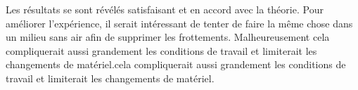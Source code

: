 Les résultats se sont révélés satisfaisant et en accord avec la théorie.
Pour améliorer l'expérience, il serait intéressant de tenter de faire la même chose dans un milieu sans air afin de supprimer les frottements. Malheureusement cela compliquerait aussi grandement les conditions de travail et limiterait les changements de matériel.cela compliquerait aussi grandement les conditions de travail et limiterait les changements de matériel.
